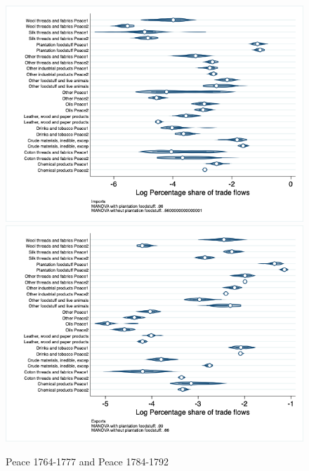 \documentclass[12pt,a4paper,notitlepage,english]{article}
\begin{document}
\begin{figure}
\centering
\caption{Peace 1764-1777 and Peace 1784-1792}
\label{seven_peace1764_1777_nat_distr}
\includegraphics[scale=.4]{peace1764_1777_peace1784_1792_nat_distr_I}
\includegraphics[scale=.4]{peace1764_1777_peace1784_1792_nat_distr_X}
\end{figure}

\end{document}
